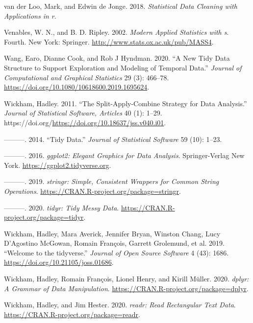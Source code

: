 \documentclass{article}
\newlength{\cslhangindent}
\newlength{\cslentryspacingunit} %
\newenvironment{CSLReferences}[2] %
 {%
  \setlength{\parindent}{0pt}
  \ifodd #1
  \let\oldpar\par
  \def\par{\hangindent=\cslhangindent\oldpar}
  \fi
  \setlength{\parskip}{#2\cslentryspacingunit}
 }%
 {}
\begin{document}
\begin{CSLReferences}{1}{0}
\leavevmode{}%
van der Loo, Mark, and Edwin de Jonge. 2018. \emph{Statistical Data Cleaning with Applications in r}.

\leavevmode{}%
Venables, W. N., and B. D. Ripley. 2002. \emph{Modern Applied Statistics with s}. Fourth. New York: Springer. \url{http://www.stats.ox.ac.uk/pub/MASS4}.

\leavevmode{}%
Wang, Earo, Dianne Cook, and Rob J Hyndman. 2020. {``A New Tidy Data Structure to Support Exploration and Modeling of Temporal Data.''} \emph{Journal of Computational and Graphical Statistics} 29 (3): 466--78. \url{https://doi.org/10.1080/10618600.2019.1695624}.

\leavevmode{}%
Wickham, Hadley. 2011. {``The Split-Apply-Combine Strategy for Data Analysis.''} \emph{Journal of Statistical Software, Articles} 40 (1): 1--29. https://doi.org/\url{https://doi.org/10.18637/jss.v040.i01}.

\leavevmode{}%
---------. 2014. {``Tidy Data.''} \emph{Journal of Statistical Software} 59 (10): 1--23.

\leavevmode{}%
---------. 2016. \emph{{ggplot2: Elegant Graphics for Data Analysis}}. Springer-Verlag New York. \url{https://ggplot2.tidyverse.org}.

\leavevmode{}%
---------. 2019. \emph{{stringr: Simple, Consistent Wrappers for Common String Operations}}. \url{https://CRAN.R-project.org/package=stringr}.

\leavevmode{}%
---------. 2020. \emph{{tidyr: Tidy Messy Data}}. \url{https://CRAN.R-project.org/package=tidyr}.

\leavevmode{}%
Wickham, Hadley, Mara Averick, Jennifer Bryan, Winston Chang, Lucy D'Agostino McGowan, Romain François, Garrett Grolemund, et al. 2019. {``Welcome to the {tidyverse}.''} \emph{Journal of Open Source Software} 4 (43): 1686. \url{https://doi.org/10.21105/joss.01686}.

\leavevmode{}%
Wickham, Hadley, Romain François, Lionel Henry, and Kirill Müller. 2020. \emph{{dplyr: A Grammar of Data Manipulation}}. \url{https://CRAN.R-project.org/package=dplyr}.

\leavevmode{}%
Wickham, Hadley, and Jim Hester. 2020. \emph{{readr: Read Rectangular Text Data}}. \url{https://CRAN.R-project.org/package=readr}.


\end{CSLReferences}
\end{document}
